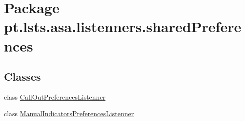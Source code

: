 \hypertarget{namespacept_1_1lsts_1_1asa_1_1listenners_1_1sharedPreferences}{}\section{Package pt.\+lsts.\+asa.\+listenners.\+shared\+Preferences}
\label{namespacept_1_1lsts_1_1asa_1_1listenners_1_1sharedPreferences}
\subsection*{Classes}
\begin{DoxyCompactItemize}
\item 
class \hyperlink{classpt_1_1lsts_1_1asa_1_1listenners_1_1sharedPreferences_1_1CallOutPreferencesListenner}{Call\+Out\+Preferences\+Listenner}
\item 
class \hyperlink{classpt_1_1lsts_1_1asa_1_1listenners_1_1sharedPreferences_1_1ManualIndicatorsPreferencesListenner}{Manual\+Indicators\+Preferences\+Listenner}
\end{DoxyCompactItemize}
